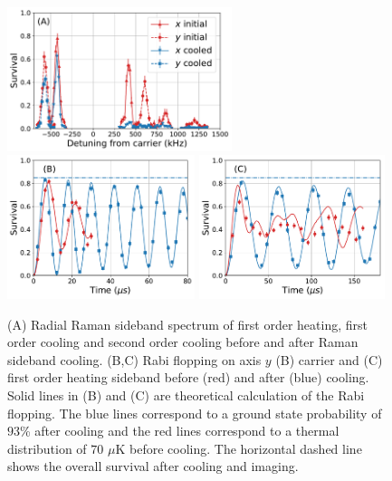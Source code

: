 \documentclass[aps,prl,twocolumn,groupedaddress]{revtex4-1}
\begin{document}
\begin{figure}
  \includegraphics[height=4.2cm]{imgs/spectrum_r.pdf}
  \includegraphics[height=4.2cm]{imgs/rabi_flop_r3_0.pdf}
  \includegraphics[height=4.2cm]{imgs/rabi_flop_r3_p1.pdf}
  \caption{(A) Radial Raman sideband spectrum of first order heating, first order cooling and
    second order cooling before and after Raman sideband cooling.
    (B,C) Rabi flopping on axis $y$ (B) carrier and (C) first order heating sideband
    before (red) and after (blue) cooling.
    Solid lines in (B) and (C) are theoretical calculation of the Rabi flopping.
    The blue lines correspond to a ground state probability of $93$\% after cooling and
    the red lines correspond to a thermal distribution of $70$ $\mu$K before cooling.
    The horizontal dashed line shows the overall survival after cooling and imaging.
    \label{f-radial}}
\end{figure}
\end{document}
